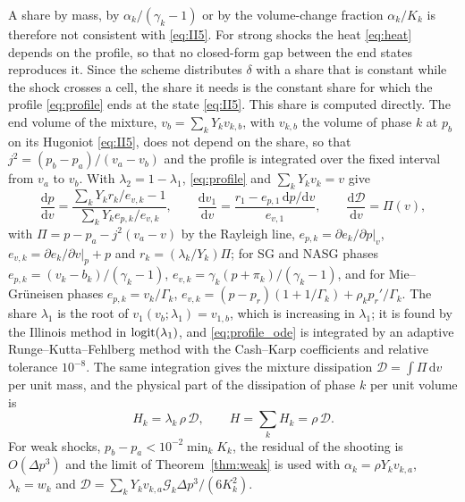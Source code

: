A share by mass, by $\alpha_k/(\gamma_k-1)$ or by the volume-change fraction $\alpha_k/K_k$ is therefore not consistent with
\eqref{eq:II5}. For strong shocks the heat \eqref{eq:heat} depends on the profile, so that no closed-form gap between the end states
reproduces it. Since the scheme distributes $\delta$ with a share that is constant while the shock crosses a cell, the
share it needs is the constant share for which the profile \eqref{eq:profile} ends at the state \eqref{eq:II5}. This share is
computed directly. The end volume of the mixture, $v_b=\sum_kY_kv_{k,b}$, with $v_{k,b}$ the volume of phase $k$ at $p_b$ on its
Hugoniot \eqref{eq:II5}, does not depend on the share, so that $j^2=(p_b-p_a)/(v_a-v_b)$ and the profile is integrated over
the fixed interval from $v_a$ to $v_b$. With $\lambda_2=1-\lambda_1$, \eqref{eq:profile} and $\sum_kY_kv_k=v$ give
\begin{equation}
\frac{\mathrm dp}{\mathrm dv}=\frac{\sum_kY_kr_k/e_{v,k}-1}{\sum_kY_ke_{p,k}/e_{v,k}},\qquad
\frac{\mathrm dv_1}{\mathrm dv}=\frac{r_1-e_{p,1}\,\mathrm dp/\mathrm dv}{e_{v,1}},\qquad
\frac{\mathrm d\mathcal D}{\mathrm dv}=\Pi(v),
\label{eq:profile_ode}
\end{equation}
with $\Pi=p-p_a-j^2(v_a-v)$ by the Rayleigh line, $e_{p,k}=\partial e_k/\partial p|_{v}$, $e_{v,k}=\partial e_k/\partial v|_{p}+p$ and $r_k=(\lambda_k/Y_k)\Pi$; for SG and NASG phases
$e_{p,k}=(v_k-b_k)/(\gamma_k-1)$, $e_{v,k}=\gamma_k(p+\pi_k)/(\gamma_k-1)$, and for Mie--Gr\"uneisen phases $e_{p,k}=v_k/\Gamma_k$,
$e_{v,k}=(p-p_r)(1+1/\Gamma_k)+\rho_kp_r'/\Gamma_k$. The share $\lambda_1$ is the root of $v_1(v_b;\lambda_1)=v_{1,b}$, which is increasing in $\lambda_1$; it is
found by the Illinois method in ${\rm logit}(\lambda_1)$, and \eqref{eq:profile_ode} is integrated by an adaptive Runge--Kutta--Fehlberg method
with the Cash--Karp coefficients and relative tolerance $10^{-8}$. The same integration gives the mixture dissipation $\mathcal D=\int\Pi\,\mathrm dv$ per
unit mass, and the physical part of the dissipation of phase $k$ per unit volume is
\begin{equation}
H_k=\lambda_k\,\rho\,\mathcal D,\qquad H=\sum_kH_k=\rho\,\mathcal D .
\label{eq:Qk}
\end{equation}
For weak shocks, $p_b-p_a<10^{-2}\min_kK_k$, the residual of the shooting is $O(\Delta p^3)$ and the limit of
Theorem~\ref{thm:weak} is used with $\alpha_k=\rho Y_kv_{k,a}$, $\lambda_k=w_k$ and
$\mathcal D=\sum_kY_kv_{k,a}\mathcal G_k\Delta p^3/(6K_k^2)$.


